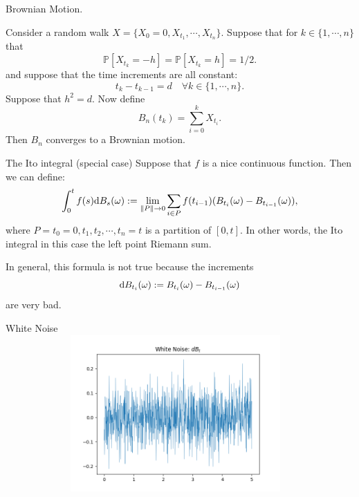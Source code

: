 \documentclass{beamer}%
\numberwithin{equation}{section}
\newcommand{\Norm}[1]{\left\|  #1   \right\|}
\newcommand{\ud}{\ensuremath{\mathrm{d} }}
\begin{document}
	\begin{frame}{Brownian Motion.}
		
		\begin{Theorem}
			Consider a random walk $X = \{X_{0}=0, X_{t_1}, \cdots, X_{t_n}\}$. Suppose that for $k \in \{1, \cdots ,n\}$ that
			\[
			\mathbb{P}\left[ X_{t_k} = -h \right] = \mathbb{P}\left[ X_{t_k} = h \right] = 1/2.
			\]
			and suppose that the time increments are all constant:
			\[
			t_k-t_{k-1} = d \quad \forall k \in \{ 1, \cdots, n \}.
			\]
			Suppose that $h^2 = d$. Now define 
			\[
			B_n(t_{k}) = \sum_{i=0}^k X_{t_i}.
			\]
			Then $B_n$ converges to a Brownian motion. 
		\end{Theorem}
	\end{frame}
	
	\begin{frame}[t]{The Ito integral (special case)}
		Suppose that $f$ is a nice continuous function. Then we can define: \vspace{.1in}
		\[
		\int_0^t f(s) \ud B_s(\omega) := \lim_{\Norm{P} \to 0} \sum _{i \in P} f(t_{i-1}) (B_{t_i}(\omega) - B_{t_{i-1}}(\omega)), \vspace{.1in}
		\]
		where $P = {t_0 = 0, t_1, t_2, \cdots, t_n = t}$ is a partition of $[0,t]$. In other words, the Ito integral in this case the left point Riemann sum. 
		
		\vspace{.1in}
		In general, this formula is not true because the increments \vspace{.1in}
		\[
		\ud B_{t_i}(\omega) :=  B_{t_i}(\omega) - B_{t_{i-1}}(\omega) \vspace{.1in}
		\]
		are very bad.
		
		
	\end{frame}
	
	\begin{frame}[t]{White Noise}
		\centering
		\includegraphics[width=13cm, height=6cm]{whitenoise.png}
	\end{frame}
	
\end{document}
